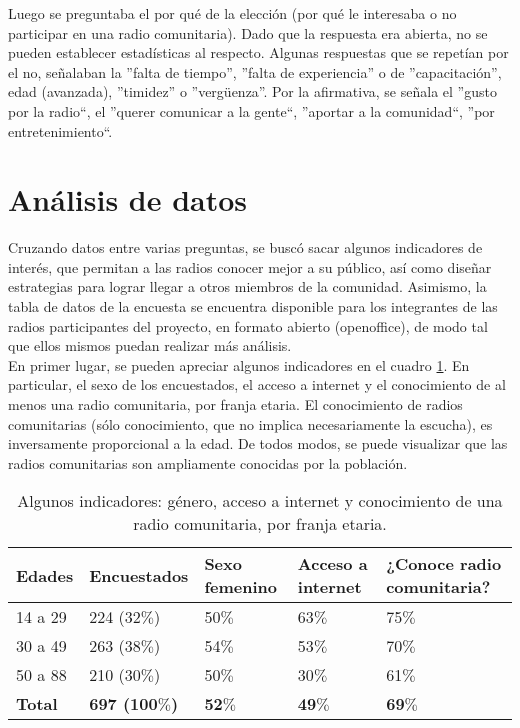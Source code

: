 Luego se preguntaba el por qué de la elección (por qué le interesaba o no participar en una radio comunitaria). Dado que la respuesta era abierta, no se pueden establecer estadísticas al respecto. Algunas respuestas que se repetían por el no, señalaban la ''falta de tiempo'', ''falta de experiencia'' o de ''capacitación'', edad (avanzada), ''timidez'' o ''vergüenza''. Por la afirmativa, se señala el ''gusto por la radio``, el ''querer comunicar a la gente``, ''aportar a la comunidad``, ''por entretenimiento``.
\newpage
\section{Análisis de datos}

\indent Cruzando datos entre varias preguntas, se buscó sacar algunos indicadores de interés, que permitan a las radios conocer mejor a su público, así como diseñar estrategias para lograr llegar a otros miembros de la comunidad. Asimismo, la tabla de datos de la encuesta se encuentra disponible para los integrantes de las radios participantes del proyecto, en formato abierto (openoffice), de modo tal que ellos mismos puedan realizar más análisis.\\

\indent En primer lugar, se pueden apreciar algunos indicadores en el cuadro \ref{VariosIndicadoresEdadTabla}. En particular, el sexo de los encuestados, el acceso a internet y el conocimiento de al menos una radio comunitaria, por franja etaria. El conocimiento de radios comunitarias (sólo conocimiento, que no implica necesariamente la escucha), es inversamente proporcional a la edad. De todos modos, se puede visualizar que las radios comunitarias son ampliamente conocidas por la población.\\

\begin{table}[htpb]
	\centering
{}
		\begin{tabular}{|p{1.3cm}|p{2cm}|p{1.6cm}|p{1.6cm}|p{1.6cm}|}\hline
      \textbf{Edades}&\textbf{Encuestados}&\textbf{Sexo femenino}&\textbf{Acceso a internet}&\textbf{¿Conoce radio comunitaria?}\\
\hline\hline
			14 a 29	&	224 (32$\%$)&50$\%$&63$\%$&75$\%$\\\hline
			30 a 49 	&	263 (38$\%$)&54$\%$&53$\%$&70$\%$\\\hline
			50 a 88 	&	210 (30$\%$)&50$\%$&30$\%$&61$\%$\\\hline\hline
			\textbf{Total}	&\textbf{697 (100$\%$)}&\textbf{52$\%$}&\textbf{49$\%$}&\textbf{69$\%$}\\\hline
		\end{tabular}
	  \caption{Algunos indicadores: género, acceso a internet y conocimiento de una radio comunitaria, por franja etaria.}
	  \label{VariosIndicadoresEdadTabla}
\end{table}

